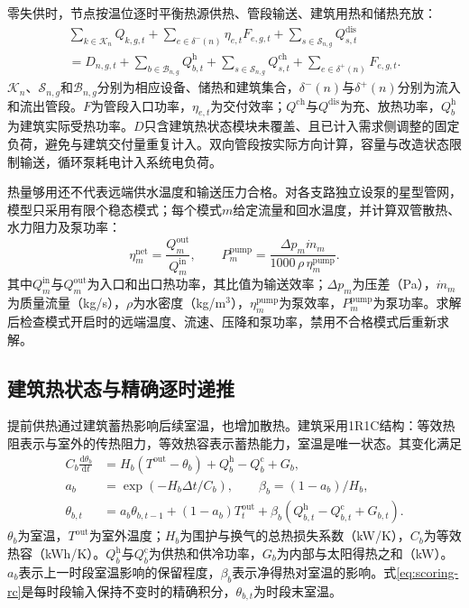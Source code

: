 零失供时，节点按温位逐时平衡热源供热、管段输送、建筑用热和储热充放：
\begin{multline}
\sum_{k\in\mathcal K_n}Q_{k,g,t}
+\sum_{e\in\delta^-(n)}\eta_{e,t}F_{e,g,t}
+\sum_{s\in\mathcal S_{n,g}}Q_{s,t}^{\mathrm{dis}}\\
=D_{n,g,t}+\sum_{b\in\mathcal B_{n,g}}Q_{b,t}^{\mathrm h}
+\sum_{s\in\mathcal S_{n,g}}Q_{s,t}^{\mathrm{ch}}
+\sum_{e\in\delta^+(n)}F_{e,g,t}.
\label{eq:scoring-node}
\end{multline}
$\mathcal K_n$、$\mathcal S_{n,g}$和$\mathcal B_{n,g}$分别为相应设备、储热和建筑集合，$\delta^-(n)$与$\delta^+(n)$分别为流入和流出管段。$F$为管段入口功率，$\eta_{e,t}$为交付效率；$Q^{\mathrm{ch}}$与$Q^{\mathrm{dis}}$为充、放热功率，$Q_b^{\mathrm h}$为建筑实际受热功率。$D$只含建筑热状态模块未覆盖、且已计入需求侧调整的固定负荷，避免与建筑交付量重复计入。双向管段按实际方向计算，容量与改造状态限制输送，循环泵耗电计入系统电负荷。

热量够用还不代表远端供水温度和输送压力合格。对各支路独立设泵的星型管网，模型只采用有限个稳态模式；每个模式$m$给定流量和回水温度，并计算双管散热、水力阻力及泵功率：
\begin{equation}
\eta_m^{\mathrm{net}}=\frac{Q_m^{\mathrm{out}}}{Q_m^{\mathrm{in}}},
\qquad
P_m^{\mathrm{pump}}=
\frac{\Delta p_m\dot m_m}{1000\,\rho\,\eta_m^{\mathrm{pump}}}.
\label{eq:scoring-network}
\end{equation}
其中$Q_m^{\mathrm{in}}$与$Q_m^{\mathrm{out}}$为入口和出口热功率，其比值为输送效率；$\Delta p_m$为压差（Pa），$\dot m_m$为质量流量（kg/s），$\rho$为水密度（kg/m$^3$），$\eta_m^{\mathrm{pump}}$为泵效率，$P_m^{\mathrm{pump}}$为泵功率。求解后检查模式开启时的远端温度、流速、压降和泵功率，禁用不合格模式后重新求解。

\subsection{建筑热状态与精确逐时递推}

提前供热通过建筑蓄热影响后续室温，也增加散热。建筑采用1R1C结构：等效热阻表示与室外的传热阻力，等效热容表示蓄热能力，室温是唯一状态。其变化满足
\begin{align}
C_b\frac{\mathrm d\theta_b}{\mathrm dt}
&=H_b(T^{\mathrm{out}}-\theta_b)+Q_b^{\mathrm h}-Q_b^{\mathrm c}+G_b,
\label{eq:scoring-rc-cont}\\
a_b&=\exp(-H_b\Delta t/C_b),\qquad
\beta_b=(1-a_b)/H_b,\\
\theta_{b,t}
&=a_b\theta_{b,t-1}+(1-a_b)T_t^{\mathrm{out}}
+\beta_b(Q_{b,t}^{\mathrm h}-Q_{b,t}^{\mathrm c}+G_{b,t}).
\label{eq:scoring-rc}
\end{align}
$\theta_b$为室温，$T^{\mathrm{out}}$为室外温度；$H_b$为围护与换气的总热损失系数（kW/K），$C_b$为等效热容（kWh/K）。$Q_b^{\mathrm h}$与$Q_b^{\mathrm c}$为供热和供冷功率，$G_b$为内部与太阳得热之和（kW）。$a_b$表示上一时段室温影响的保留程度，$\beta_b$表示净得热对室温的影响。式\eqref{eq:scoring-rc}是每时段输入保持不变时的精确积分，$\theta_{b,t}$为时段末室温。

